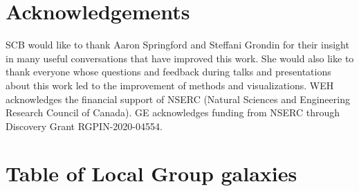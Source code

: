 \documentclass[twocolumn]{aastex631}
\begin{document}
\section*{Acknowledgements}

SCB would like to thank Aaron Springford and Steffani Grondin for their insight in many useful conversations that have improved this work. She would also like to thank everyone whose questions and feedback during talks and presentations about this work led to the improvement of methods and visualizations.
WEH acknowledges the financial support of NSERC (Natural Sciences and Engineering Research Council of Canada). GE acknowledges funding from NSERC through Discovery Grant RGPIN-2020-04554.



\vspace{5mm}

{}


\appendix

\section{Table of Local Group galaxies} \label{sec:app1}
\end{document}
